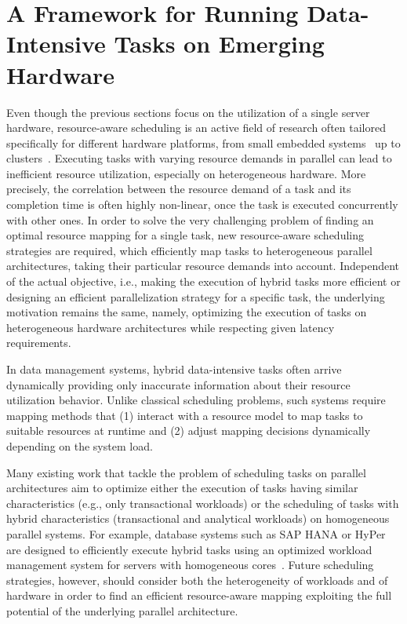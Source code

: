 \documentclass[11pt]{article}
\begin{document}
\section{A Framework for Running Data-Intensive Tasks on Emerging Hardware}
\label{sec:guide}

Even though the previous sections focus on the utilization of a single server hardware,
resource-aware scheduling is an active field of research often tailored specifically for different hardware platforms,
from small embedded systems~\cite{Tillenius_2015} up to clusters~\cite{Delimitrou_2014}.
Executing tasks with varying resource demands in parallel can lead to inefficient resource utilization,
especially on heterogeneous hardware.
More precisely, the correlation between the resource demand of a task and its completion time is often highly non-linear,
once the task is executed concurrently with other ones.
In order to solve the very challenging problem of finding an optimal resource mapping for a single task,
new resource-aware scheduling strategies are required,
which efficiently map tasks to heterogeneous parallel architectures,
taking their particular resource demands into account. 
Independent of the actual objective,
i.e., making the execution of hybrid tasks more efficient or
designing an efficient parallelization strategy for a specific task,
the underlying motivation remains the same, namely,
optimizing the execution of tasks on heterogeneous hardware architectures while respecting given latency requirements.

In data management systems,
hybrid data-intensive tasks often arrive dynamically
providing only inaccurate information about their resource utilization behavior.
Unlike classical scheduling problems, such systems require mapping methods that
(1) interact with a resource model to map tasks to suitable resources at runtime and
(2) adjust mapping decisions dynamically depending on the system load. 

Many existing work that tackle the problem of scheduling tasks on parallel architectures
aim to optimize either the execution of tasks having similar characteristics (e.g., only transactional workloads) or
the scheduling of tasks with hybrid characteristics (transactional and analytical workloads) on homogeneous parallel systems.
For example, database systems such as SAP HANA or HyPer are designed to efficiently execute hybrid tasks
using an optimized workload management system for servers with homogeneous cores~\cite{Psaroudakis_2015}.
Future scheduling strategies, however, should consider both the heterogeneity of workloads and of hardware
in order to find an efficient resource-aware mapping exploiting the full potential of the underlying parallel architecture.
\end{document}
